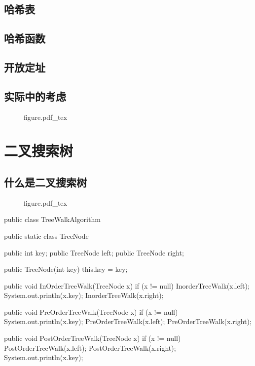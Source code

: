 \documentclass[oneside,10pt,fontset=none]{ctexbook}
\numberwithin{definition}{chapter}
\numberwithin{theorem}{chapter}
\numberwithin{lemma}{chapter}
\begin{document}
\section{哈希表}

\section{哈希函数}

\section{开放定址}

\section{实际中的考虑}

\begin{figure}[htbp]
    \def\svgwidth{\columnwidth}
    {figure.pdf_tex}
\end{figure}

\chapter{二叉搜索树}\label{chapter:二叉搜索树}

\section{什么是二叉搜索树}

\begin{figure}[htbp]
    \def\svgwidth{\columnwidth}
    {figure.pdf_tex}
\end{figure}

\begin{myjava}{}{}{}
public class TreeWalkAlgorithm {
    public static class TreeNode {
        public int key;
        public TreeNode left;
        public TreeNode right;

        public TreeNode(int key) {
            this.key = key;
        }
    }

    public void InOrderTreeWalk(TreeNode x) {
        if (x != null) {
            InorderTreeWalk(x.left);
            System.out.println(x.key);
            InorderTreeWalk(x.right);
        }
    }

    public void PreOrderTreeWalk(TreeNode x) {
        if (x != null) {
            System.out.println(x.key);
            PreOrderTreeWalk(x.left);
            PreOrderTreeWalk(x.right);
        }
    }

    public void PostOrderTreeWalk(TreeNode x) {
        if (x != null) {
            PostOrderTreeWalk(x.left);
            PostOrderTreeWalk(x.right);
            System.out.println(x.key);
        }
    }
}
\end{myjava}
\end{document}
